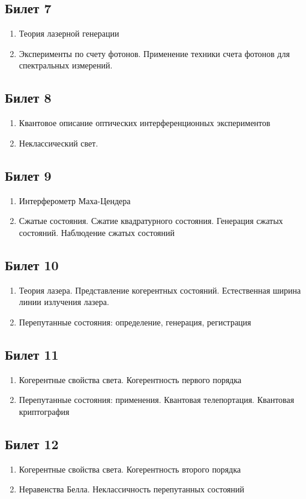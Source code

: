 \subsection*{Билет 7} 
\begin{enumerate}
\item Теория лазерной генерации
\item Эксперименты по счету фотонов. Применение техники счета
  фотонов для спектральных измерений.
\end{enumerate}

\subsection*{Билет 8} 
\begin{enumerate}
\item Квантовое описание оптических интерференционных экспериментов
\item Неклассический свет.
\end{enumerate}

\subsection*{Билет 9} 
\begin{enumerate}
\item Интерферометр Маха-Цендера
\item Сжатые состояния. Сжатие квадратурного состояния. Генерация
  сжатых состояний. Наблюдение сжатых состояний
\end{enumerate}

\subsection*{Билет 10} 
\begin{enumerate}
\item Теория лазера. Представление когерентных состояний. Естественная
  ширина линии излучения лазера.
\item Перепутанные состояния: определение, генерация, регистрация
\end{enumerate}

\subsection*{Билет 11} 
\begin{enumerate}
\item Когерентные свойства света. Когерентность первого порядка
\item Перепутанные состояния: применения. Квантовая
  телепортация. Квантовая криптография
\end{enumerate}

\subsection*{Билет 12} 
\begin{enumerate}
\item Когерентные свойства света. Когерентность второго порядка
\item Неравенства Белла. Неклассичность перепутанных состояний
\end{enumerate}



